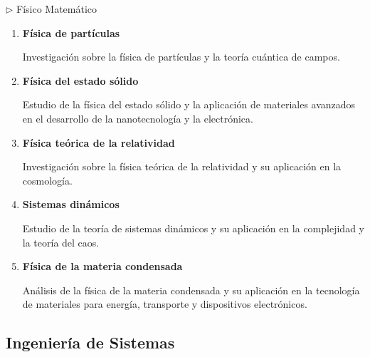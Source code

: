 \documentclass[12pt,a4paper]{article}
\begin{document}
\begin{careerbox}{$\triangleright$ Físico Matemático}
	\begin{enumerate}
		\item \textbf{Física de partículas}
		
		Investigación sobre la física de partículas y la teoría cuántica de campos.
		
		\item \textbf{Física del estado sólido}
		
		Estudio de la física del estado sólido y la aplicación de materiales avanzados en el desarrollo de la nanotecnología y la electrónica.
		
		\item \textbf{Física teórica de la relatividad}
		
		Investigación sobre la física teórica de la relatividad y su aplicación en la cosmología.
		
		\item \textbf{Sistemas dinámicos}
		
		Estudio de la teoría de sistemas dinámicos y su aplicación en la complejidad y la teoría del caos.
		
		\item \textbf{Física de la materia condensada}
		
		Análisis de la física de la materia condensada y su aplicación en la tecnología de materiales para energía, transporte y dispositivos electrónicos.
	\end{enumerate}
\end{careerbox}

\subsection{Ingeniería de Sistemas}
\end{document}
